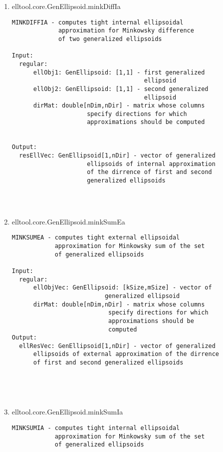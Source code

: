 \begin{enumerate}
\begin{lstlisting}
\end{lstlisting}
\fontfamily{\familydefault}
\selectfont
\item {elltool.core.GenEllipsoid.minkDiffIa}
\selectfont
\begin{lstlisting}
MINKDIFFIA - computes tight internal ellipsoidal
             approximation for Minkowsky difference
             of two generalized ellipsoids

Input:
  regular:
      ellObj1: GenEllipsoid: [1,1] - first generalized
                                     ellipsoid
      ellObj2: GenEllipsoid: [1,1] - second generalized
                                     ellipsoid
      dirMat: double[nDim,nDir] - matrix whose columns
                     specify directions for which
                     approximations should be computed


Output:
  resEllVec: GenEllipsoid[1,nDir] - vector of generalized
                     ellipsoids of internal approximation
                     of the dirrence of first and second
                     generalized ellipsoids




\end{lstlisting}
\fontfamily{\familydefault}
\selectfont
\item {elltool.core.GenEllipsoid.minkSumEa}
\selectfont
\begin{lstlisting}
MINKSUMEA - computes tight external ellipsoidal
            approximation for Minkowsky sum of the set
            of generalized ellipsoids

Input:
  regular:
      ellObjVec: GenEllipsoid: [kSize,mSize] - vector of
                          generalized ellipsoid
      dirMat: double[nDim,nDir] - matrix whose columns
                           specify directions for which
                           approximations should be
                           computed
Output:
  ellResVec: GenEllipsoid[1,nDir] - vector of generalized
      ellipsoids of external approximation of the dirrence
      of first and second generalized ellipsoids





\end{lstlisting}
\fontfamily{\familydefault}
\selectfont
\item {elltool.core.GenEllipsoid.minkSumIa}
\selectfont
\begin{lstlisting}
MINKSUMIA - computes tight internal ellipsoidal
            approximation for Minkowsky sum of the set
            of generalized ellipsoids


\end{lstlisting}
\end{enumerate}
